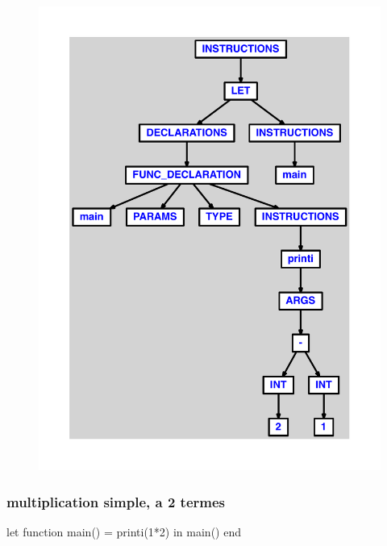 \documentclass{article}
\begin{document}
\begin{figure}[H]\centering\includegraphics[max width=\textwidth]{ast/ast_40.pdf}\end{figure}\subsubsection{multiplication simple, a 2 termes}
\begin{verbatimtab}
let
	function main() = printi(1*2)
in main() end
\end{verbatimtab}
\end{document}
